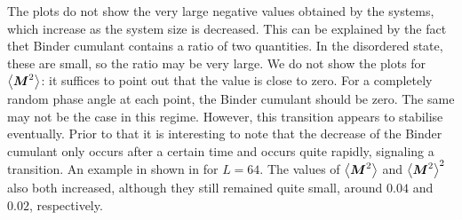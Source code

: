 The plots do not show the very large negative values obtained by the systems, which increase as the system size is decreased. This can be explained by the fact thet Binder cumulant contains a ratio of two quantities. In the disordered state, these are small, so the ratio may be very large. We do not show the plots for $\left < \boldsymbol{M}^2 \right >$: it suffices to point out that the value is close to zero. For a completely random phase angle at each point, the Binder cumulant should be zero. The same may not be the case in this regime. However, this transition appears to stabilise eventually. Prior to that it is interesting to note that the decrease of the Binder cumulant only occurs after a certain time and occurs quite rapidly, signaling a transition. An example in shown in \fig{\ref{fig:binder_transition}} for $L=64$. The values of $\left < \boldsymbol{M}^2 \right >$ and $\left < \boldsymbol{M}^2 \right >^2$ also both increased, although they still remained quite small, around $0.04$ and $0.02$, respectively.

